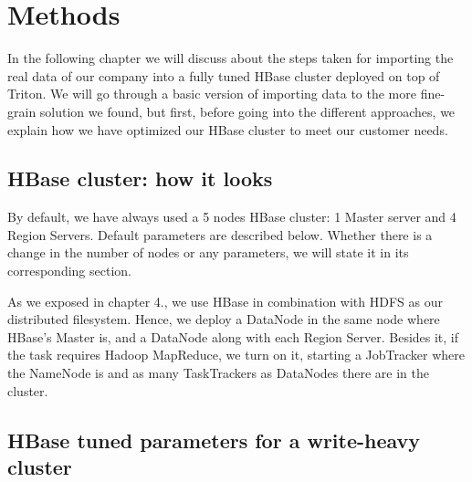 \chapter{Methods}
\label{chapter:methods}

In the following chapter we will discuss about the steps taken for importing the real data of our company into a fully tuned HBase cluster deployed on top of Triton. We will go through a basic version of importing data to the more fine-grain solution we found, but first, before going into the different approaches, we explain how we have optimized our HBase cluster to meet our customer needs.

\section{HBase cluster: how it looks}

By default, we have always used a 5 nodes HBase cluster: 1 Master server and 4 Region Servers. Default parameters are described below. Whether there is a change in the number of nodes or any parameters, we will state it in its corresponding section.
\par
As we exposed in chapter 4., we use HBase in combination with HDFS as our distributed filesystem. Hence, we deploy a DataNode in the same node where HBase's Master is, and a DataNode along with each Region Server. Besides it, if the task requires Hadoop MapReduce, we turn on it, starting a JobTracker where the NameNode is and as many TaskTrackers as DataNodes there are in the cluster.

\section{HBase tuned parameters for a write-heavy cluster}

